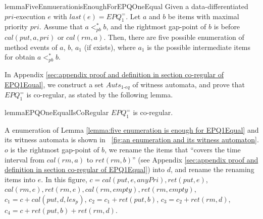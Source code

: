 \begin{restatable}{lemma}{FiveEnmuerationisEnoughForEPQOneEqual}
\label{lemma:five enumeration is enough for EPQ1Equal}
Given a data-differentiated $\textit{pri}$-execution $e$ with $\textit{last}(e) = \textit{EPQ}_1^{=}$. Let $a$ and $b$ be items with maximal priority $\textit{pri}$. Assume that $a <_{\textit{pb}}^* b$, and the rightmost gap-point of $b$ is before $\textit{cal}(\textit{put},a,\textit{pri})$ or $\textit{cal}(\textit{rm},a)$. Then, there are five possible enumeration of method events of $a$, $b$, $a_1$ (if exists), where $a_1$ is the possible intermediate items for obtain $a <_{\textit{pb}}^* b$.
\end{restatable}

In Appendix \ref{sec:appendix proof and definition in section co-regular of EPQ1Equal}, we construct a set $\textit{Auts}_{\textit{1-eq}}$ of witness automata, and prove that $\textit{EPQ}_1^{=}$ is co-regular, as stated by the following lemma.

\begin{restatable}{lemma}{EPQOneEqualIsCoRegular}
\label{lemma:EPQ1Equal is co-regular}
$\textit{EPQ}_1^{=}$ is co-regular.
\end{restatable}

A enumeration of Lemma \ref{lemma:five enumeration is enough for EPQ1Equal} and its witness automata is shown in \figurename~\ref{fig:an enumeration and its witness automaton}. $o$ is the rightmost gap-point of $b$, we rename the items that ``covers the time interval from $\textit{cal}(\textit{rm},a)$ to $\textit{ret}(\textit{rm},b)$'' (see Appendix \ref{sec:appendix proof and definition in section co-regular of EPQ1Equal}) into $d$, and rename the renaming items into $e$. In this figure, $c = \textit{cal}(\textit{put},e,\textit{anyPri}),\textit{ret}(\textit{put},e)$, $\textit{cal}(\textit{rm},e), \textit{ret}(\textit{rm},e),\textit{cal}(\textit{rm},\textit{empty}),\textit{ret}(\textit{rm},\textit{empty})$, $c_1 = c + \textit{cal}(\textit{put},d,\textit{les}_p)$, $c_2 = c_1 + \textit{ret}(\textit{put},b)$, $c_3 = c_2 + \textit{ret}(\textit{rm},d)$, $c_4 = c + \textit{ret}(\textit{put},b) + \textit{ret}(\textit{rm},d)$.


